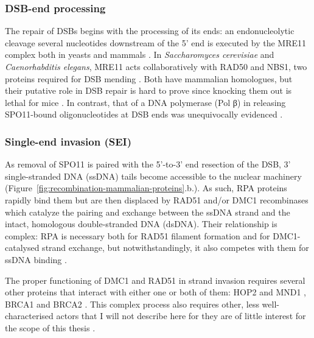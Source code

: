 \subsubsection{DSB-end processing}
The repair of DSBs begins with the processing of its ends: an endonucleolytic cleavage several nucleotides downstream of the 5' end \citep{neale2005endonucleolytic} is executed by the MRE11 complex both in yeasts \citep[reviewed in][]{borde2009double} and mammals \citep[reviewed in][]{borde2007multiple}.
In \textit{Saccharomyces cerevisiae} and \textit{Caenorhabditis elegans}, MRE11 acts collaboratively with RAD50 and NBS1, two proteins required for DSB mending \citep[reviewed in][]{lam2015mechanism}. 
Both have mammalian homologues, but their putative role in DSB repair \citep[reviewed in][]{baudat2013meiotic} is hard to prove since knocking them out is lethal for mice \citep{luo1999disruption,zhu2001targeted}.
In contrast, that of a DNA polymerase (Pol \textgreek{β}) in releasing SPO11-bound oligonucleotides at DSB ends was unequivocally evidenced \citep[reviewed in \citealp{baudat2013meiotic}]{kidane2010dna}.



\subsubsection{Single-end invasion (SEI)}
As removal of SPO11 is paired with the 5’-to-3’ end resection of the DSB, 3’ single-stranded DNA (ssDNA) tails become accessible to the nuclear machinery (Figure~\ref{fig:recombination-mammalian-proteins}.b.).
As such, RPA proteins rapidly bind them \citep{he1995rpa} but are then displaced by RAD51 and/or DMC1 recombinases \citep{pittman1998meiotic,yoshida1998mouse} which catalyze the pairing and exchange between the ssDNA strand and the intact, homologous double-stranded DNA (dsDNA).
Their relationship is complex: RPA is necessary both for RAD51 filament formation and for DMC1-catalysed strand exchange, but notwithstandingly, it also competes with them for ssDNA binding \citep{sung2003rad51}.

The proper functioning of DMC1 and RAD51 in strand invasion requires several other proteins that interact with either one or both of them: HOP2 and MND1 \citep{bugreev2014hop2mnd1}, BRCA1 \citep{scully1997association} and BRCA2 \citep{thorslund2007interactions}.
This complex process also requires other, less well-characterised actors that I will not describe here for they are of little interest for the scope of this thesis \citep[but for review, see][and Figure~\ref{fig:recombination-mammalian-proteins}.c.]{neale2006clarifying}.

